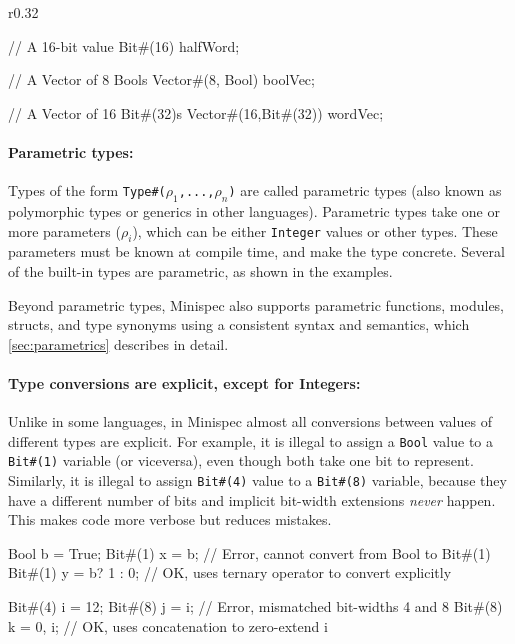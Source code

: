 \begin{wrapfigure}{r}{0.32\columnwidth}
\vspace{-2em}
\begin{mscode}
// A 16-bit value
Bit#(16) halfWord;

// A Vector of 8 Bools
Vector#(8, Bool) boolVec;

// A Vector of 16 Bit#(32)s
Vector#(16,Bit#(32)) wordVec;
\end{mscode}
\vspace{-2em}
\end{wrapfigure}

\paragraph{Parametric types:} Types of the form \texttt{Type\#($\rho_1$,...,$\rho_n$)} are called parametric types
(also known as polymorphic types or generics in other languages).
Parametric types take one or more parameters ($\rho_i$), which can be either \texttt{Integer} values or other types.
These parameters must be known at compile time, and make the type concrete.
Several of the built-in types are parametric, as shown in the examples.

Beyond parametric types, Minispec also supports parametric functions, modules, structs, and type synonyms
using a consistent syntax and semantics, which \autoref{sec:parametrics} describes in detail.

\paragraph{Type conversions are explicit, except for Integers:}
Unlike in some languages, in Minispec almost all conversions between values of different types are explicit.
For example, it is illegal to assign a \texttt{Bool} value to a \texttt{Bit\#(1)} variable (or viceversa),
even though both take one bit to represent.
Similarly, it is illegal to assign \texttt{Bit\#(4)} value to a \texttt{Bit\#(8)} variable, because they have a different number of bits
and implicit bit-width extensions \emph{never} happen.
This makes code more verbose but reduces mistakes.

\begin{mscode}
Bool b = True;
Bit#(1) x = b;         // Error, cannot convert from Bool to Bit#(1)
Bit#(1) y = b? 1 : 0;  // OK, uses ternary operator to convert explicitly

Bit#(4) i = 12;
Bit#(8) j = i;         // Error, mismatched bit-widths 4 and 8
Bit#(8) k = {0, i};    // OK, uses concatenation to zero-extend i
\end{mscode}

